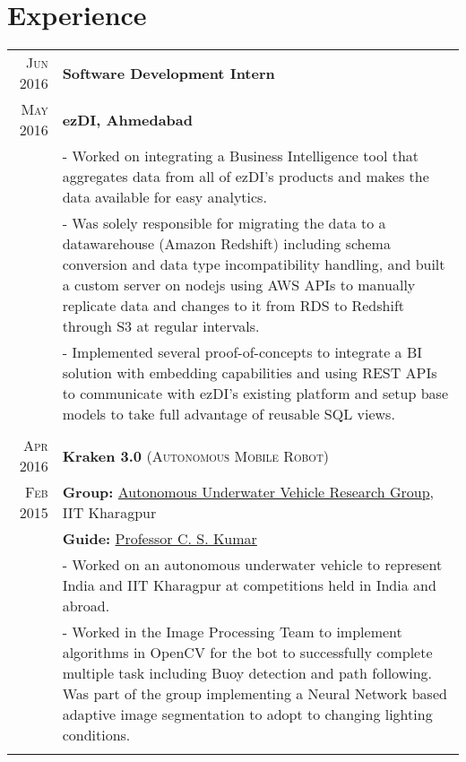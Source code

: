 \documentclass[a4paper,10pt]{extarticle} %
\begin{document}
\section{Experience}

\begin{tabular}{r|p{16cm}}

\textsc{Jun 2016} & \textbf{Software Development Intern}\\
\textsc{May 2016} & \textbf{ezDI, Ahmedabad}\\
& \footnotesize{- Worked on integrating a Business Intelligence tool that aggregates data from all of ezDI's products and makes the data available for easy analytics.}\\
& \footnotesize{- Was solely responsible for migrating the data to a datawarehouse (Amazon Redshift) including schema conversion and data type incompatibility handling, and built a custom server on nodejs using AWS APIs to manually replicate data and changes to it from RDS to Redshift through S3 at regular intervals.}\\
& \footnotesize{- Implemented several proof-of-concepts to integrate a BI solution with embedding capabilities and using REST APIs to communicate with ezDI's existing platform and setup base models to take full advantage of reusable SQL views.}\\
\multicolumn{2}{c}{} \\

\textsc{Apr 2016} & \textbf{Kraken 3.0} \textsc{(Autonomous Mobile Robot)} \\
\textsc{Feb 2015} & \textbf{Group: }\textmd{\href{http://auv-iitkgp.in/}{Autonomous Underwater Vehicle Research Group}}, IIT Kharagpur\\
& \textbf{Guide: }\textmd{\href{http://iitkgp.ac.in/fac-profiles/showprofile.php?empcode=aWmdU}{Professor C. S. Kumar}}\\
& \footnotesize{- Worked on an autonomous underwater vehicle to represent India and IIT Kharagpur at competitions held in India and abroad.}\\
& \footnotesize{- Worked in the Image Processing Team to implement algorithms in OpenCV for the bot to successfully complete multiple task including Buoy detection and path following. Was part of the group implementing a Neural Network based adaptive image segmentation to adopt to changing lighting conditions.}\\
\multicolumn{2}{c}{} \\

\end{tabular}
\end{document}
